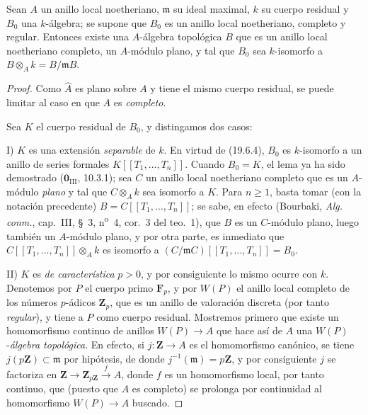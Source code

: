 \begin{lemma}[19.7.1.3]
\label{0.19.7.1.3-fr}
Sean $A$ un anillo local noetheriano, $\mathfrak m$ su ideal maximal, $k$ su
cuerpo residual y $B_0$ una $k$-álgebra; se supone que $B_0$ es un anillo
local noetheriano, completo y \textup{regular}. Entonces existe una $A$-álgebra
topológica $B$ que es un anillo local noetheriano completo, un $A$-módulo \textup{plano},
y tal que $B_0$ sea $k$-isomorfo a
$B\otimes_A k=B/\mathfrak mB$.
\end{lemma}

\begin{proof}
Como $\widehat A$ es plano sobre $A$ y tiene el mismo cuerpo residual, se puede limitar
al caso en que $A$ es \emph{completo}.

Sea $K$ el cuerpo residual de $B_0$, y distingamos dos casos:

\medskip
\noindent I) $K$ es una extensión \emph{separable} de $k$. En virtud de
(19.6.4), $B_0$ es $k$-isomorfo a un anillo de series formales
$K[[T_1,\ldots,T_n]]$. Cuando $B_0=K$, el lema ya ha sido demostrado
($\mathbf 0_{\mathrm{III}}$, 10.3.1); sea $C$ un anillo local noetheriano
completo que es un $A$-módulo \emph{plano} y tal que $C\otimes_A k$ sea isomorfo a
$K$. Para $n\geq1$, basta tomar (con la notación precedente)
$B=C[[T_1,\ldots,T_n]]$; se sabe, en efecto (Bourbaki,
\emph{Alg. conm.}, cap.~III, §~3, n\textsuperscript{o}~4, cor.~3 del teo.~1),
que $B$ es un $C$-módulo plano, luego también un $A$-módulo plano, y por otra parte,
es inmediato que $C[[T_1,\ldots,T_n]]\otimes_A k$ es isomorfo a
$(C/\mathfrak mC)[[T_1,\ldots,T_n]]=B_0$.

\medskip
\noindent II) $K$ es \emph{de característica} $p>0$, y por consiguiente lo mismo
ocurre con $k$. Denotemos por $P$ el cuerpo primo $\mathbf F_p$, y por $W(P)$ el anillo
local completo de los números $p$-ádicos $\mathbf Z_p$, que es un anillo de
valoración discreta (por tanto \emph{regular}), y tiene a $P$ como cuerpo residual.
Mostremos primero que existe un homomorfismo continuo de anillos $W(P)\to A$
que hace así de $A$ una $W(P)$-\emph{álgebra topológica}. En efecto, si
$j:\mathbf Z\to A$ es el homomorfismo canónico, se tiene
$j(p\mathbf Z)\subset\mathfrak m$ por hipótesis, de donde
$j^{-1}(\mathfrak m)=p\mathbf Z$, y por consiguiente $j$ se factoriza en
$\mathbf Z\to\mathbf Z_{p\mathbf Z}\xrightarrow{f}A$, donde $f$ es un
homomorfismo local, por tanto continuo, que (puesto que $A$ es completo) se prolonga
por continuidad al homomorfismo $W(P)\to A$ buscado.


\end{proof}
